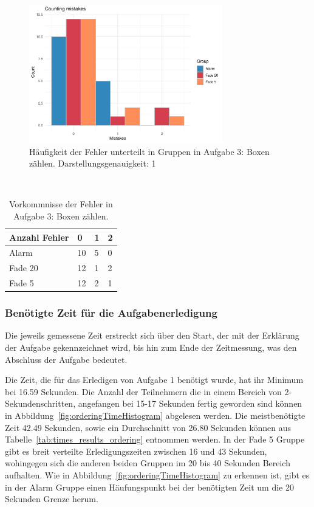 \begin{figure}[H]
	\centering
	\includegraphics[width=0.75\textwidth]{./_StudyResults/countingMisHist}
	\caption{Häufigkeit der Fehler unterteilt in Gruppen in Aufgabe 3: Boxen zählen. Darstellungsgenauigkeit: 1}
	\label{fig:countingMistakeHistogram}
\end{figure}

\begin{table}
	\caption{Vorkommnisse der Fehler in Aufgabe 3: Boxen zählen.}~\label{tab:countingMistakeNumbers}
	
	\setlength\tabcolsep{3pt}
	\renewcommand{\arraystretch}{1.4}%
	\begin{tabularx}{\textwidth}{ | l | x | x | x | }
		\hline
		Anzahl Fehler & 0   & 1  & 2 \\ \hline\hline
		Alarm 	  & 10  & 5  & 0 \\ \hline
		Fade 20   & 12  & 1  & 2 \\ \hline
		Fade 5 	  & 12  & 2  & 1 \\ \hline
	\end{tabularx}
\end{table}

\subsubsection{Benötigte Zeit für die Aufgabenerledigung}

Die jeweils gemessene Zeit erstreckt sich über den Start, der mit der Erklärung der Aufgabe gekennzeichnet wird, bis hin zum Ende der Zeitmessung, was den Abschluss der Aufgabe bedeutet.

Die Zeit, die für das Erledigen von Aufgabe 1 benötigt wurde, hat ihr Minimum bei 16.59 Sekunden. Die Anzahl der Teilnehmern die in einem Bereich von 2-Sekundenschritten, angefangen bei 15-17 Sekunden fertig geworden sind können in Abbildung~\ref{fig:orderingTimeHistogram} abgelesen werden. Die meistbenötigte Zeit 42.49 Sekunden, sowie ein Durchschnitt von 26.80 Sekunden können aus Tabelle~\ref{tab:times_results_ordering} entnommen werden.
In der Fade 5 Gruppe gibt es breit verteilte Erledigungszeiten zwischen 16 und 43 Sekunden, wohingegen sich die anderen beiden Gruppen im 20 bis 40 Sekunden Bereich aufhalten. Wie in Abbildung~\ref{fig:orderingTimeHistogram} zu erkennen ist, gibt es in der Alarm Gruppe einen Häufungspunkt bei der benötigten Zeit um die 20 Sekunden Grenze herum.

